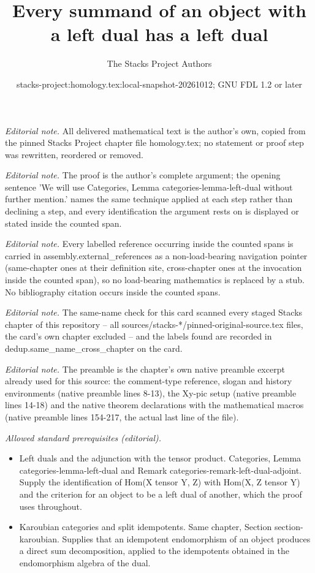 \documentclass[10pt,a4paper]{amsart}
\title{Every summand of an object with a left dual has a left dual}
\author{The Stacks Project Authors}
\date{stacks-project:homology.tex:local-snapshot-20261012; GNU FDL 1.2 or later}
\theoremstyle{plain}
\theoremstyle{definition}
\theoremstyle{remark}
\numberwithin{equation}{subsection}
\begin{document}
\maketitle
\noindent\textit{Editorial note.} All delivered mathematical text is the author's own, copied from the pinned Stacks Project chapter file homology.tex; no statement or proof step was rewritten, reordered or removed.\par\medskip
\noindent\textit{Editorial note.} The proof is the author's complete argument; the opening sentence 'We will use Categories, Lemma categories-lemma-left-dual without further mention.' names the same technique applied at each step rather than declining a step, and every identification the argument rests on is displayed or stated inside the counted span.\par\medskip
\noindent\textit{Editorial note.} Every labelled reference occurring inside the counted spans is carried in assembly.external\_references as a non-load-bearing navigation pointer (same-chapter ones at their definition site, cross-chapter ones at the invocation inside the counted span), so no load-bearing mathematics is replaced by a stub. No bibliography citation occurs inside the counted spans.\par\medskip
\noindent\textit{Editorial note.} The same-name check for this card scanned every staged Stacks chapter of this repository -- all sources/stacks-*/pinned-original-source.tex files, the card's own chapter excluded -- and the labels found are recorded in dedup.same\_name\_cross\_chapter on the card.\par\medskip
\noindent\textit{Editorial note.} The preamble is the chapter's own native preamble excerpt already used for this source: the comment-type reference, slogan and history environments (native preamble lines 8-13), the Xy-pic setup (native preamble lines 14-18) and the native theorem declarations with the mathematical macros (native preamble lines 154-217, the actual last line of the file).\par\medskip
\noindent\textit{Allowed standard prerequisites (editorial).}\begin{itemize}
\item Left duals and the adjunction with the tensor product. Categories, Lemma categories-lemma-left-dual and Remark categories-remark-left-dual-adjoint. Supply the identification of Hom(X tensor Y, Z) with Hom(X, Z tensor Y) and the criterion for an object to be a left dual of another, which the proof uses throughout.
\item Karoubian categories and split idempotents. Same chapter, Section section-karoubian. Supplies that an idempotent endomorphism of an object produces a direct sum decomposition, applied to the idempotents obtained in the endomorphism algebra of the dual.
\end{itemize}\medskip
\end{document}
